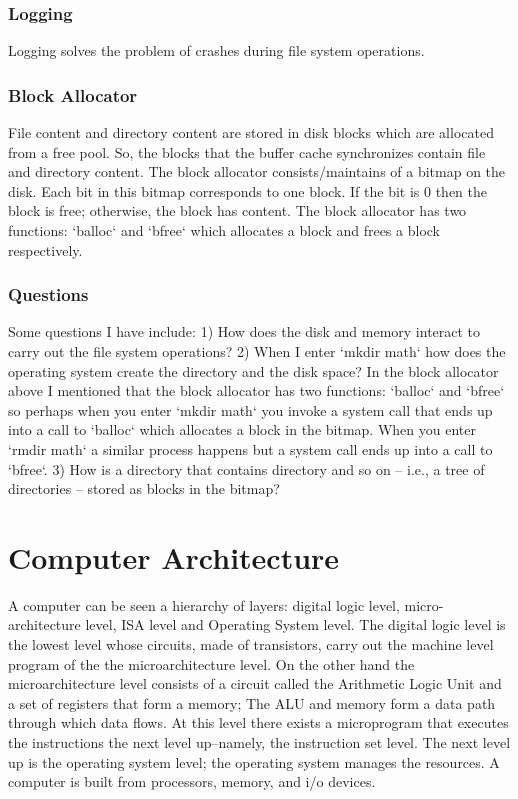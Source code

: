 \documentclass{amsbook}
\begin{document}
\subsection{Logging}

Logging solves the problem of crashes during file system operations.

\subsection{Block Allocator}
File content and directory content are stored in disk blocks which are allocated from a free pool. So, the blocks that the buffer cache synchronizes contain file and directory content. The block allocator consists/maintains of a bitmap on the disk. Each bit in this bitmap corresponds to one block. If the bit is 0 then the block is free; otherwise, the block has content. The block allocator has two functions: `balloc` and `bfree` which allocates a block and frees a block respectively.

\subsection{Questions}
Some questions I have include: 1) How does the disk and memory interact to carry out the file system operations? 2) When I enter `mkdir math` how does the operating system create the directory and the disk space? In the block allocator above I mentioned that the block allocator has two functions: `balloc` and `bfree` so perhaps when you enter `mkdir math` you invoke a system call that ends up into a call to `balloc` which allocates a block in the bitmap. When you enter `rmdir math` a similar process happens but a system call ends up into a call to `bfree`. 3) How is a directory that contains directory and so on -- i.e., a tree of directories -- stored as blocks in the bitmap?
\chapter{Computer Architecture}

A computer can be seen a hierarchy of layers: digital logic level, micro-architecture level, ISA level and Operating System level. The digital logic level is the lowest level whose circuits, made of transistors, carry out the machine level program of the the microarchitecture level. On the other hand the microarchitecture level consists of a circuit called the Arithmetic Logic Unit and a set of registers that form a memory; The ALU and memory form a data path through which data flows. At this level there exists a microprogram that executes the instructions the next level up--namely, the instruction set level. The next level up is the operating system level; the operating system manages the resources. A computer is built from processors, memory, and i/o devices.
\end{document}
